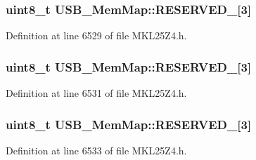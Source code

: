 \subsubsection[{\texorpdfstring{R\+E\+S\+E\+R\+V\+E\+D\+\_\+14}{RESERVED_14}}]{\setlength{\rightskip}{0pt plus 5cm}uint8\+\_\+t U\+S\+B\+\_\+\+Mem\+Map\+::\+R\+E\+S\+E\+R\+V\+E\+D\+\_\mbox{[}3\mbox{]}}\hypertarget{struct_u_s_b___mem_map_ae5232a4f0fad6b378ed9b5cf2334ec2f}{}\label{struct_u_s_b___mem_map_ae5232a4f0fad6b378ed9b5cf2334ec2f}


Definition at line 6529 of file M\+K\+L25\+Z4.\+h.

\subsubsection[{\texorpdfstring{R\+E\+S\+E\+R\+V\+E\+D\+\_\+15}{RESERVED_15}}]{\setlength{\rightskip}{0pt plus 5cm}uint8\+\_\+t U\+S\+B\+\_\+\+Mem\+Map\+::\+R\+E\+S\+E\+R\+V\+E\+D\+\_\mbox{[}3\mbox{]}}\hypertarget{struct_u_s_b___mem_map_aaca846c7a5ad434ef5ca2bdd0afa3097}{}\label{struct_u_s_b___mem_map_aaca846c7a5ad434ef5ca2bdd0afa3097}


Definition at line 6531 of file M\+K\+L25\+Z4.\+h.

\subsubsection[{\texorpdfstring{R\+E\+S\+E\+R\+V\+E\+D\+\_\+16}{RESERVED_16}}]{\setlength{\rightskip}{0pt plus 5cm}uint8\+\_\+t U\+S\+B\+\_\+\+Mem\+Map\+::\+R\+E\+S\+E\+R\+V\+E\+D\+\_\mbox{[}3\mbox{]}}\hypertarget{struct_u_s_b___mem_map_a323b2e876677952f283931c075882bb0}{}\label{struct_u_s_b___mem_map_a323b2e876677952f283931c075882bb0}


Definition at line 6533 of file M\+K\+L25\+Z4.\+h.

